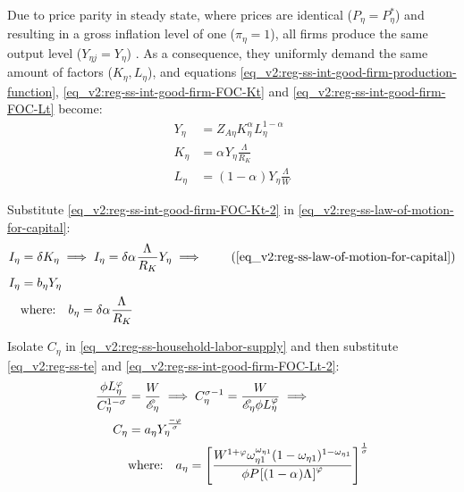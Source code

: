 \documentclass[../thesis.tex]{subfiles}
\begin{document}
Due to price parity in steady state, where prices are identical ($P_{\eta} = P_{\eta}^{\ast}$) and resulting in a gross inflation level of one ($\pi_{\eta} = 1$), all firms produce the same output level ($Y_{\eta j} = Y_{\eta}$) \cite[Lecture 13, p.12]{solis-garcia_ucb_2022}. As a consequence, they uniformly demand the same amount of factors ($K_{\eta}, L_{\eta}$), and equations \ref{eq_v2:reg-ss-int-good-firm-production-function}, \ref{eq_v2:reg-ss-int-good-firm-FOC-Kt} and \ref{eq_v2:reg-ss-int-good-firm-FOC-Lt} become: %
\begin{align}
	Y_{\eta} &= Z_{A\eta} K_{\eta}^{\alpha_{}} L_{\eta}^{1 -{\alpha_{}}} \label{eq_v2:reg-ss-int-good-firm-production-function-2} \\	
	K_{\eta} &= {\alpha_{}} Y_{\eta} \frac{\Lambda_{}}{R_K} \label{eq_v2:reg-ss-int-good-firm-FOC-Kt-2} \\
	L_{\eta} &= (1-{\alpha_{}}) Y_{\eta} \frac{\Lambda_{}}{W} \label{eq_v2:reg-ss-int-good-firm-FOC-Lt-2}
\end{align}
	
	Substitute \ref{eq_v2:reg-ss-int-good-firm-FOC-Kt-2} in \ref{eq_v2:reg-ss-law-of-motion-for-capital}:
	\begin{align}
		I_{\eta} &= \delta K_{\eta} \implies I_{\eta} = \delta {\alpha_{}} \frac{\Lambda_{}}{R_K} Y_{\eta} \implies \tag{\ref{eq_v2:reg-ss-law-of-motion-for-capital}} \\
		I_{\eta} &= b_{\eta} Y_{\eta} \label{eq_v2:reg-ss-investment} \\
		& \text{where:} \quad b_{\eta} = \delta {\alpha_{}} \frac{\Lambda_{}}{R_K} \label{eq_v2:reg-ss-b-eta}
	\end{align}
	
	Isolate $C_{\eta}$ in \ref{eq_v2:reg-ss-household-labor-supply} and then substitute \ref{eq_v2:reg-ss-te} and \ref{eq_v2:reg-ss-int-good-firm-FOC-Lt-2}:
	\begin{align}
		\frac{\phi L_{\eta}^{\varphi}}{C_{\eta}^{1-\sigma}} &= \frac{W}{\te[]} \implies C_{\eta}^{\sigma -1} = \frac{W}{\te[] \phi L_{\eta}^{\varphi}} \implies \nonumber\\
		C_{\eta} &= a_{\eta} Y_{\eta}^{\frac{-\varphi}{\sigma}} \label{eq_v2:reg-ss-consumption} \\
		& \text{where:} \quad a_{\eta} = \left[ \frac{W^{1 +\varphi} \omega_{\eta 1}^{\omega_{\eta 1}} (1 -\omega_{\eta 1})^{1 -\omega_{\eta 1}}}{\phi P_{} \left[ (1 -\alpha_{}) \Lambda_{} \right]^{\varphi}} \right]^{\frac{1}{\sigma}} \label{eq_v2:reg-ss-a-eta}
	\end{align}
\end{document}
